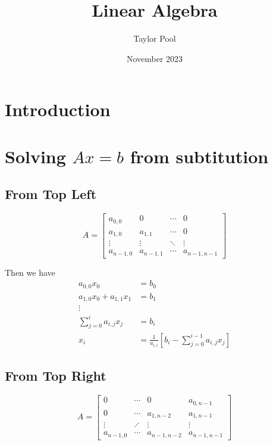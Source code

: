 \documentclass{article}
\title{Linear Algebra}
\author{Taylor Pool}
\date{November 2023}
\begin{document}
\maketitle

\section{Introduction}

\section{Solving $Ax = b$ from subtitution}

\subsection{From Top Left}

\begin{equation*}
    A = \begin{bmatrix}
        a_{0,0} & 0 & \cdots & 0 \\
        a_{1,0} & a_{1,1} & \cdots & 0 \\
        \vdots & \vdots & \ddots & \vdots \\
        a_{n-1,0} & a_{n-1,1} & \cdots & a_{n-1,n-1}
    \end{bmatrix}
\end{equation*}

Then we have
\begin{align*}
    a_{0,0} x_0 &= b_0 \\
    a_{1,0} x_0 + a_{1,1} x_1 &= b_1 \\
    \vdots \\
    \sum_{j = 0}^i a_{i,j} x_j &= b_i \\
    x_i &= \frac{1}{a_{i,i}} \left[ b_i - \sum_{j=0}^{i-1} a_{i,j} x_j \right]
\end{align*}

\subsection{From Top Right}

\begin{equation*}
    A = \begin{bmatrix}
        0 & \cdots & 0 & a_{0,n-1} \\
        0 & \cdots & a_{1,n-2} & a_{1,n-1} \\
        \vdots & \iddots & \vdots & \vdots \\
        a_{n-1,0} & \cdots & a_{n-1,n-2} & a_{n-1,n-1}
    \end{bmatrix}
\end{equation*}
\end{document}
